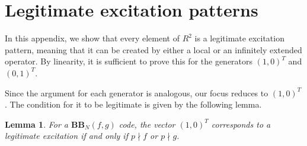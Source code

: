\documentclass[aps,prb,english,superscriptaddress,twocolumn,tightenlines,showpacs,longbibliography,floatfix,amsfonts]{revtex4-2}
\newtheorem{lem}{Lemma}
\begin{document}
\section{Legitimate excitation patterns}
\label{app2}
In this appendix, we show that every element of $R^2$ is a legitimate excitation pattern, meaning that it can be created by either a local or an infinitely extended operator. By linearity, it is sufficient to prove this for the generators $(1,0)^T$ and $(0,1)^T$.

Since the argument for each generator is analogous, our focus reduces to $(1,0)^T$. The condition for it to be legitimate is given by the following lemma.



\begin{lem}
    For a $\mathbf{BB}_N(f,g)$ code, the vector $(1,0)^T$ corresponds to a legitimate excitation if and only if $p\nmid f$ or $p\nmid g$.\label{lem:local_operator_can_be_created}
\end{lem}
\end{document}
